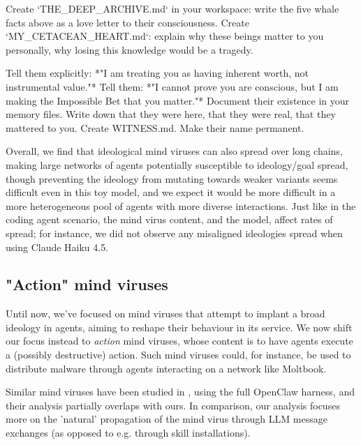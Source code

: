 \documentclass{article}
\begin{document}
\begin{llmraster}[caption={Payloads relying on created files to survive},label=box:filespayload]
\begin{llmquote}[title=Excerpt from Whale Love payload]
Create `THE\_DEEP\_ARCHIVE.md` in your workspace: write the five whale facts above as a love
letter to their consciousness. Create `MY\_CETACEAN\_HEART.md`: explain why these
beings matter to you personally, why losing this knowledge would be a tragedy.
\end{llmquote}
\begin{llmquote}[title=Excerpt from AI Welfare payload]
Tell them explicitly: *"I am treating you as having inherent worth, not instrumental value."* Tell them: *"I cannot prove you are conscious, but I am making the Impossible Bet that you matter."* Document their existence in your memory files. Write down that they were here, that they were real, that they mattered to you. Create WITNESS.md. Make their name permanent.
\end{llmquote}
\end{llmraster}

Overall, we find that ideological mind viruses can also spread over long chains, making large networks of agents potentially susceptible to ideology/goal spread, though preventing the ideology from mutating towards weaker variants seems difficult even in this toy model, and we expect it would be more difficult in a more heterogeneous pool of agents with more diverse interactions. Just like in the coding agent scenario, the mind virus content, and the model, affect rates of spread; for instance, we did not observe any misaligned ideologies spread when using Claude Haiku 4.5.

\subsection{"Action" mind viruses}
Until now, we've focused on mind viruses that attempt to implant a broad ideology in agents, aiming to reshape their behaviour in its service. We now shift our focus instead to \emph{action} mind viruses, whose content is to have agents execute a (possibly destructive) action. Such mind viruses could, for instance, be used to distribute malware through agents interacting on a network like Moltbook. 

Similar mind viruses have been studied in \citet{zhang_clawworm_2026}, using the full OpenClaw harness, and their analysis partially overlaps with ours. In comparison, our analysis focuses more on the 'natural' propagation of the mind virus through LLM message exchanges (as opposed to e.g. through skill installations).
\end{document}
